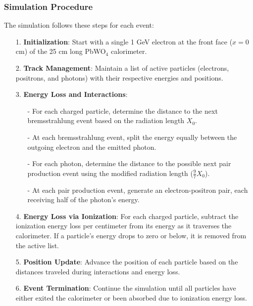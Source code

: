 \documentclass[twocolumn]{aastex631}
\begin{document}
\subsubsection{Simulation Procedure} 

The simulation follows these steps for each event: 

\begin{enumerate}
    \item[1.] \textbf{Initialization}: Start with a single 1 GeV electron at the
          front face (\(x = 0\) cm) of the 25 cm long PbWO\(_4\) calorimeter.
      \item[2.] \textbf{Track Management}: Maintain a list of active particles
          (electrons, positrons, and photons) with their respective energies and
          positions.
      \item[3.] \textbf{Energy Loss and Interactions}:
      \begin{itemize}
          \item[-] For each charged particle, determine the distance to the next
              bremsstrahlung event based on the radiation length \(X_0\).
          \item[-] At each bremsstrahlung event, split the energy equally between the
              outgoing electron and the emitted photon.
          \item[-] For each photon, determine the distance to the possible next pair
              production event using the modified radiation length (\(\frac{9}{7}
              X_0\)).
          \item[-] At each pair production event, generate an electron-positron pair,
              each receiving half of the photon's energy.
      \end{itemize}
  \item[4.] \textbf{Energy Loss via Ionization}: For each charged particle,
          subtract the ionization energy loss per centimeter from its energy as it
          traverses the calorimeter. If a particle's energy drops to zero or
          below, it is removed from the active list.
      \item[5.] \textbf{Position Update}: Advance the position of each particle based
          on the distances traveled during interactions and energy loss.
      \item[6.] \textbf{Event Termination}: Continue the simulation until all
          particles have either exited the calorimeter or been absorbed due to
          ionization energy loss.
  \end{enumerate}
\end{document}
